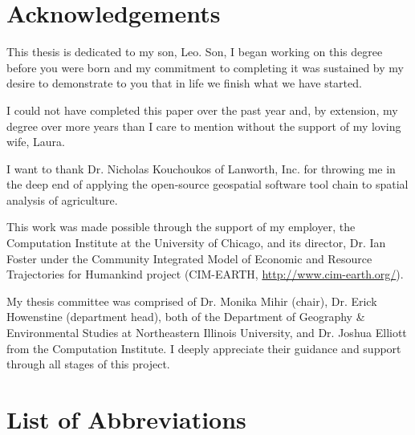\documentclass[draftthesis]{neiuthesis}
\begin{document}
\chapter*{Acknowledgements}

\noindent This thesis is dedicated to my son, Leo.  Son, I began
working on this degree before you were born and my commitment to
completing it was sustained by my desire to demonstrate to you that in
life we finish what we have started.

\vspace{12pt}
\noindent I could not have completed this paper over the past year
and, by extension, my degree over more years than I care to mention
without the support of my loving wife, Laura.

\vspace{12pt}
\noindent I want to thank Dr. Nicholas Kouchoukos of Lanworth,
Inc. for throwing me in the deep end of applying the open-source
geospatial software tool chain to spatial analysis of agriculture.

\vspace{12pt}
\noindent This work was made possible through the support of my
employer, the Computation Institute at the University of Chicago, and
its director, Dr. Ian Foster under the Community Integrated Model of
Economic and Resource Trajectories for Humankind project (CIM-EARTH,
\url{http://www.cim-earth.org/}).

\vspace{12pt}
\noindent My thesis committee was comprised of Dr. Monika Mihir
(chair), Dr. Erick Howenstine (department head), both of the
Department of Geography \& Environmental Studies at Northeastern
Illinois University, and Dr. Joshua Elliott from the Computation
Institute.  I deeply appreciate their guidance and support through all
stages of this project.


\tableofcontents 
\listoftables
\listoffigures

\chapter{List of Abbreviations}
\end{document}

